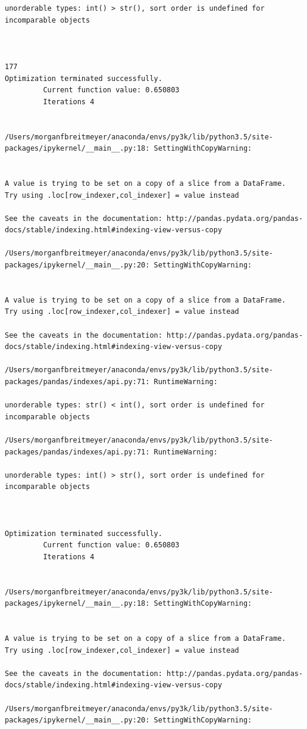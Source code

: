 \begin{lstlisting}
unorderable types: int() > str(), sort order is undefined for incomparable objects



177
Optimization terminated successfully.
         Current function value: 0.650803
         Iterations 4


/Users/morganfbreitmeyer/anaconda/envs/py3k/lib/python3.5/site-packages/ipykernel/__main__.py:18: SettingWithCopyWarning:


A value is trying to be set on a copy of a slice from a DataFrame.
Try using .loc[row_indexer,col_indexer] = value instead

See the caveats in the documentation: http://pandas.pydata.org/pandas-docs/stable/indexing.html#indexing-view-versus-copy

/Users/morganfbreitmeyer/anaconda/envs/py3k/lib/python3.5/site-packages/ipykernel/__main__.py:20: SettingWithCopyWarning:


A value is trying to be set on a copy of a slice from a DataFrame.
Try using .loc[row_indexer,col_indexer] = value instead

See the caveats in the documentation: http://pandas.pydata.org/pandas-docs/stable/indexing.html#indexing-view-versus-copy

/Users/morganfbreitmeyer/anaconda/envs/py3k/lib/python3.5/site-packages/pandas/indexes/api.py:71: RuntimeWarning:

unorderable types: str() < int(), sort order is undefined for incomparable objects

/Users/morganfbreitmeyer/anaconda/envs/py3k/lib/python3.5/site-packages/pandas/indexes/api.py:71: RuntimeWarning:

unorderable types: int() > str(), sort order is undefined for incomparable objects



Optimization terminated successfully.
         Current function value: 0.650803
         Iterations 4


/Users/morganfbreitmeyer/anaconda/envs/py3k/lib/python3.5/site-packages/ipykernel/__main__.py:18: SettingWithCopyWarning:


A value is trying to be set on a copy of a slice from a DataFrame.
Try using .loc[row_indexer,col_indexer] = value instead

See the caveats in the documentation: http://pandas.pydata.org/pandas-docs/stable/indexing.html#indexing-view-versus-copy

/Users/morganfbreitmeyer/anaconda/envs/py3k/lib/python3.5/site-packages/ipykernel/__main__.py:20: SettingWithCopyWarning:



\end{lstlisting}
